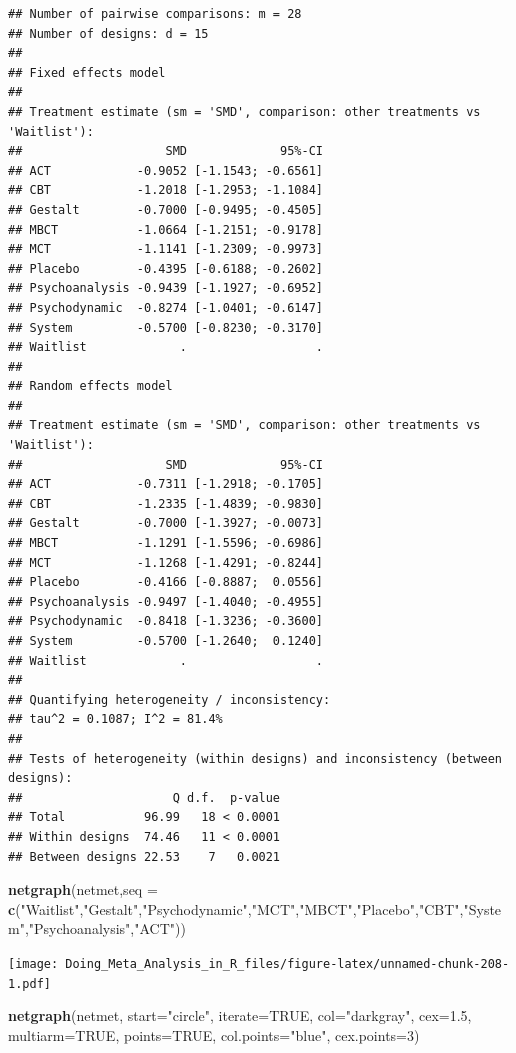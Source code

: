 \documentclass[]{book}
\newenvironment{Shaded}{\begin{snugshade}}{\end{snugshade}}
\newcommand{\DataTypeTok}[1]{\textcolor[rgb]{0.13,0.29,0.53}{#1}}
\newcommand{\DecValTok}[1]{\textcolor[rgb]{0.00,0.00,0.81}{#1}}
\newcommand{\FloatTok}[1]{\textcolor[rgb]{0.00,0.00,0.81}{#1}}
\newcommand{\KeywordTok}[1]{\textcolor[rgb]{0.13,0.29,0.53}{\textbf{#1}}}
\newcommand{\NormalTok}[1]{#1}
\newcommand{\OtherTok}[1]{\textcolor[rgb]{0.56,0.35,0.01}{#1}}
\newcommand{\StringTok}[1]{\textcolor[rgb]{0.31,0.60,0.02}{#1}}
\begin{document}
\begin{verbatim}
## Number of pairwise comparisons: m = 28
## Number of designs: d = 15
## 
## Fixed effects model
## 
## Treatment estimate (sm = 'SMD', comparison: other treatments vs 'Waitlist'):
##                    SMD             95%-CI
## ACT            -0.9052 [-1.1543; -0.6561]
## CBT            -1.2018 [-1.2953; -1.1084]
## Gestalt        -0.7000 [-0.9495; -0.4505]
## MBCT           -1.0664 [-1.2151; -0.9178]
## MCT            -1.1141 [-1.2309; -0.9973]
## Placebo        -0.4395 [-0.6188; -0.2602]
## Psychoanalysis -0.9439 [-1.1927; -0.6952]
## Psychodynamic  -0.8274 [-1.0401; -0.6147]
## System         -0.5700 [-0.8230; -0.3170]
## Waitlist             .                  .
## 
## Random effects model
## 
## Treatment estimate (sm = 'SMD', comparison: other treatments vs 'Waitlist'):
##                    SMD             95%-CI
## ACT            -0.7311 [-1.2918; -0.1705]
## CBT            -1.2335 [-1.4839; -0.9830]
## Gestalt        -0.7000 [-1.3927; -0.0073]
## MBCT           -1.1291 [-1.5596; -0.6986]
## MCT            -1.1268 [-1.4291; -0.8244]
## Placebo        -0.4166 [-0.8887;  0.0556]
## Psychoanalysis -0.9497 [-1.4040; -0.4955]
## Psychodynamic  -0.8418 [-1.3236; -0.3600]
## System         -0.5700 [-1.2640;  0.1240]
## Waitlist             .                  .
## 
## Quantifying heterogeneity / inconsistency:
## tau^2 = 0.1087; I^2 = 81.4%
## 
## Tests of heterogeneity (within designs) and inconsistency (between designs):
##                     Q d.f.  p-value
## Total           96.99   18 < 0.0001
## Within designs  74.46   11 < 0.0001
## Between designs 22.53    7   0.0021
\end{verbatim}

\begin{Shaded}
\begin{Highlighting}[]
\KeywordTok{netgraph}\NormalTok{(netmet,}\DataTypeTok{seq =} \KeywordTok{c}\NormalTok{(}\StringTok{"Waitlist"}\NormalTok{,}\StringTok{"Gestalt"}\NormalTok{,}\StringTok{"Psychodynamic"}\NormalTok{,}\StringTok{"MCT"}\NormalTok{,}\StringTok{"MBCT"}\NormalTok{,}\StringTok{"Placebo"}\NormalTok{,}\StringTok{"CBT"}\NormalTok{,}\StringTok{"System"}\NormalTok{,}\StringTok{"Psychoanalysis"}\NormalTok{,}\StringTok{"ACT"}\NormalTok{))}
\end{Highlighting}
\end{Shaded}

\texttt{[image: Doing\_Meta\_Analysis\_in\_R\_files/figure-latex/unnamed-chunk-208-1.pdf]}

\begin{Shaded}
\begin{Highlighting}[]
\KeywordTok{netgraph}\NormalTok{(netmet, }\DataTypeTok{start=}\StringTok{"circle"}\NormalTok{, }\DataTypeTok{iterate=}\OtherTok{TRUE}\NormalTok{, }\DataTypeTok{col=}\StringTok{"darkgray"}\NormalTok{, }\DataTypeTok{cex=}\FloatTok{1.5}\NormalTok{, }\DataTypeTok{multiarm=}\OtherTok{TRUE}\NormalTok{, }\DataTypeTok{points=}\OtherTok{TRUE}\NormalTok{, }\DataTypeTok{col.points=}\StringTok{"blue"}\NormalTok{, }\DataTypeTok{cex.points=}\DecValTok{3}\NormalTok{)}
\end{Highlighting}
\end{Shaded}
\end{document}
